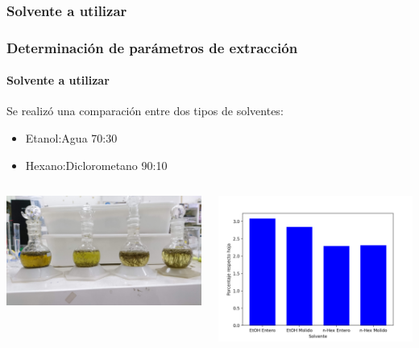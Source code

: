 \documentclass[aspectratio=1610]{beamer}
\begin{document}
\subsubsection{Solvente a utilizar}
\begin{frame}[c]
	\frametitle{Determinación de parámetros de extracción}
	\framesubtitle{Solvente a utilizar}
	Se realizó una comparación entre dos tipos de solventes:
	\begin{itemize}
	\item Etanol:Agua 70:30
	\item Hexano:Diclorometano 90:10
	\end{itemize}

	\begin{columns}
	\begin{center}
	\includegraphics[width=\textwidth]{figs/solv_select.jpg}
	\end{center}

	\begin{center}
	\includegraphics[height=0.5\textheight,keepaspectratio]{figs/experimental-seleccion-solvente.png}
	\end{center}
	\end{columns}
\end{frame}
\end{document}
